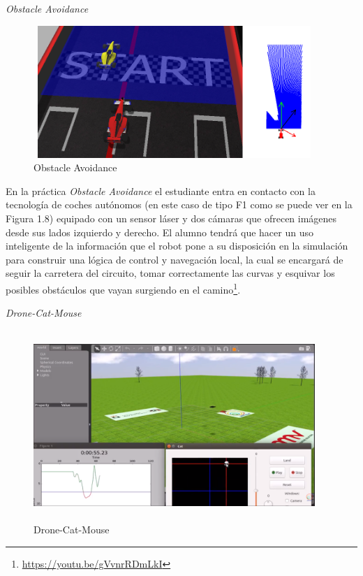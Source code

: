 \hspace{0.35\linewidth}
\textit{Obstacle Avoidance}

\begin{figure}[H]
  \begin{center}
    \includegraphics[width=0.95\textwidth, height=5cm]{figures/obstacle_avoidance.png}
		\caption{Obstacle Avoidance}
		\label{fig.obstacleavoidance}
		\end{center}
\end{figure}

En la práctica \textit{Obstacle Avoidance} el estudiante entra en contacto con la tecnología de coches autónomos (en este caso de tipo F1 como se puede ver en la Figura 1.8) equipado con un sensor láser y dos cámaras que ofrecen imágenes desde sus lados izquierdo y derecho. El alumno tendrá que hacer un uso inteligente de la información que el robot pone a su disposición en la simulación para construir una lógica de control y navegación local, la cual se encargará de seguir la carretera del circuito, tomar correctamente las curvas y esquivar los posibles obstáculos que vayan surgiendo en el camino\footnote{\url{https://youtu.be/gVvnrRDmLkI}}.

\vspace{7cm}
\hspace{0.35\linewidth}
\textit{Drone-Cat-Mouse}

\begin{figure}[H]
  \begin{center}
    \includegraphics[width=0.95\textwidth, height=7.2cm]{figures/dronecatmouse.png}
		\caption{Drone-Cat-Mouse}
		\label{fig.dronecatmouse}
		\end{center}
\end{figure}

